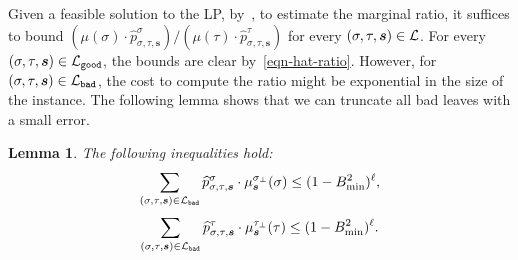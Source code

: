 \documentclass[11pt]{article}
\newtheorem{lemma}[theorem]{Lemma}
\def\!#1{\mathtt{#1}}
\newcommand{\wh}[1]{\widehat{#1}}
\newcommand{\seqS}{\boldsymbol{s}}
\newcommand{\qgl}[1]{{\color{purple}{#1}}}
\begin{document}


\qgl{check from here}
Given a feasible solution to the LP, by~, to estimate the marginal ratio, it suffices to bound $\left(\mu(\sigma)\cdot \wh{p}_{\sigma, \tau, \seqS}^{\sigma}\right)/\left(\mu(\tau)\cdot\wh{p}_{\sigma, \tau, \seqS}^{\tau}\right)$ for every $(\sigma, \tau, \seqS) \in \+L$. For every $(\sigma, \tau, \seqS) \in \+L_{\!{good}}$, the bounds are clear by~\eqref{eqn-hat-ratio}. However, for $(\sigma, \tau, \seqS) \in \+L_{\!{bad}}$, the cost to compute the ratio might be exponential in the size of the instance. The following lemma shows that we can truncate all bad leaves with a small error.

\begin{lemma} \label{lem:LP-truncated-error}
    The following inequalities hold:
    \begin{align}\label{eqn-error1}
        \sum_{(\sigma,\tau, \seqS)\in \+L_{\!{bad}}} \widehat{p}_{\sigma,\tau, \seqS}^{\sigma}\cdot \mu^{\sigma_{\bot}}_{\seqS}(\sigma)\leq (1 - B_{\min}^2)^{\ell},
    \end{align}
    \begin{align}\label{eqn-error2}
        \sum_{(\sigma,\tau, \seqS)\in \+L_{\!{bad}}}\widehat{p}_{\sigma,\tau, \seqS}^{\tau}\cdot \mu^{\tau_{\bot}}_{\seqS}(\tau)\leq (1- B_{\min}^2)^{\ell}.
    \end{align}
\end{lemma}
\end{document}
